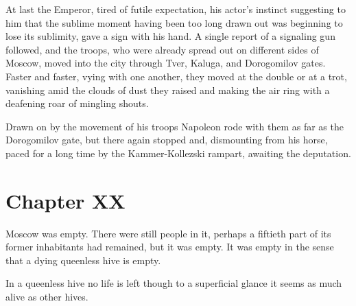 At last the Emperor, tired of futile expectation, his actor's
instinct suggesting to him that the sublime moment having been
too long drawn out was beginning to lose its sublimity, gave a
sign with his hand. A single report of a signaling gun followed,
and the troops, who were already spread out on different sides of
Moscow, moved into the city through Tver, Kaluga, and Dorogomilov
gates. Faster and faster, vying with one another, they moved at
the double or at a trot, vanishing amid the clouds of dust they
raised and making the air ring with a deafening roar of mingling
shouts.

Drawn on by the movement of his troops Napoleon rode with them as
far as the Dorogomilov gate, but there again stopped and,
dismounting from his horse, paced for a long time by the
Kammer-Kollezski rampart, awaiting the deputation.


\chapter*{Chapter XX} \ifaudio {}
\fi

 Moscow was empty. There were still people in it,
perhaps a fiftieth part of its former inhabitants had remained,
but it was empty.  It was empty in the sense that a dying
queenless hive is empty.

In a queenless hive no life is left though to a superficial
glance it seems as much alive as other hives.

